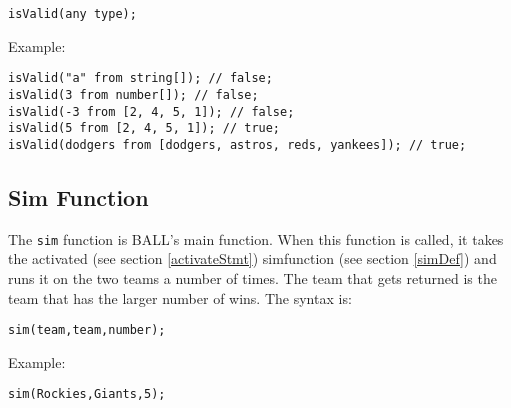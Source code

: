 \begin{verbatim}
isValid(any type);
\end{verbatim}
Example: 
\begin{verbatim}
isValid("a" from string[]); // false;
isValid(3 from number[]); // false;
isValid(-3 from [2, 4, 5, 1]); // false;
isValid(5 from [2, 4, 5, 1]); // true;
isValid(dodgers from [dodgers, astros, reds, yankees]); // true;
\end{verbatim}

\subsection{Sim Function}
The \texttt{sim} function is BALL's main function. When this function
is called, it takes the activated (see section \ref{activateStmt})
simfunction (see section \ref{simDef}) and runs it on the two teams a
number of times. The team that gets returned is the team that has the
larger number of wins. The syntax is:
\begin{verbatim}
sim(team,team,number);
\end{verbatim}
Example: 
\begin{verbatim}
sim(Rockies,Giants,5); 
\end{verbatim}
